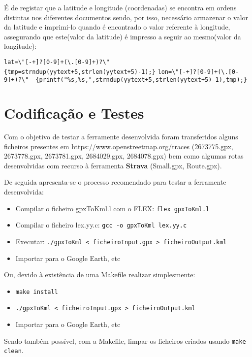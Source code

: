 \documentclass{llncs}
\begin{document}
É de registar que a latitude e longitude (coordenadas) se encontra em ordens distintas nos diferentes documentos sendo, por isso, necessário armazenar o valor da latitude
e imprimi-lo quando é encontrado o valor referente à longitude, assegurando que este(valor da latitude) é impresso a seguir ao mesmo(valor da longitude): 
\begin{changemargin}{-1cm}{0cm}
\verb|lat=\"[-+]?[0-9]+(\.[0-9]+)?\"  {tmp=strndup(yytext+5,strlen(yytext+5)-1);}|
\verb|lon=\"[-+]?[0-9]+(\.[0-9]+)?\"  {printf("%s,%s,",strndup(yytext+5,strlen(yytext+5)-1),tmp);}|
\end{changemargin}

\section{Codificação e Testes}
Com o objetivo de testar a ferramente desenvolvida foram transferidos alguns ficheiros presentes em https://www.openstreetmap.org/traces (2673775.gpx, 2673778.gpx, 2673781.gpx, 2684029.gpx, 2684078.gpx) bem como algumas rotas desenvolvidas com recurso à ferramenta \textbf{Strava} (Small.gpx, Route.gpx).

De seguida apresenta-se o processo recomendado para testar a ferramente desenvolvida:
\begin{itemize}
    \item Compilar o ficheiro gpxToKml.l com o FLEX: \verb|flex gpxToKml.l|
    \item Compilar o ficheiro lex.yy.c: \verb|gcc -o gpxToKml lex.yy.c|
    \item Executar: \verb|./gpxToKml < ficheiroInput.gpx > ficheiroOutput.kml|
    \item Importar para o Google Earth, etc
\end{itemize}

Ou, devido à existência de uma Makefile realizar simplesmente:
\begin{itemize}
    \item \verb|make install|
    \item \verb|./gpxToKml < ficheiroInput.gpx > ficheiroOutput.kml|
    \item Importar para o Google Earth, etc
\end{itemize}

Sendo também possível, com a Makefile, limpar os ficheiros criados usando \verb|make clean|.
\end{document}

